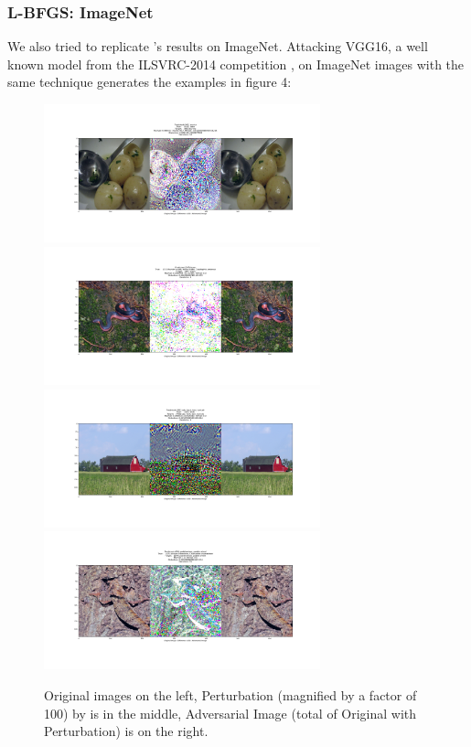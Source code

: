 \documentclass[10pt]{extarticle}
\begin{document}
\subsubsection{L-BFGS: ImageNet}
\label{lbfgs-s}
We also tried to replicate \cite{Szegedy2013}'s results on ImageNet. Attacking VGG16, a well known model from the ILSVRC-2014 competition \cite{simonyan2014very}, on ImageNet images with the same technique generates the examples in figure 4: 

\begin{figure}[H]
\label{lbfgsis}
\includegraphics[trim=200 185 100 200, clip, width=8cm]{2019-04-10-adverse/imnet_examples/vgg16-ILSVRC2012_val_00039098-O722-A965-attack_summary.png}\includegraphics[trim=200 185 100 200, clip, width=8cm]{2019-04-10-adverse/imnet_examples/vgg16-ILSVRC2012_val_00027142-O52-A347-attack_summary.png}
\includegraphics[trim=200 185 100 200, clip, width=8cm]{2019-04-10-adverse/imnet_examples/vgg16-ILSVRC2012_val_00029901-O425-A468-attack_summary.png}\includegraphics[trim=200 185 100 200, clip, width=8cm]{2019-04-10-adverse/imnet_examples/ILSVRC2012_val_00001375-Otensor([42])-A694-attack_summary.png}
\caption{Original images on the left, Perturbation (magnified by a factor of 100) by is in the middle, Adversarial Image (total of Original with Perturbation) is on the right. }
\end{figure}
\end{document}
